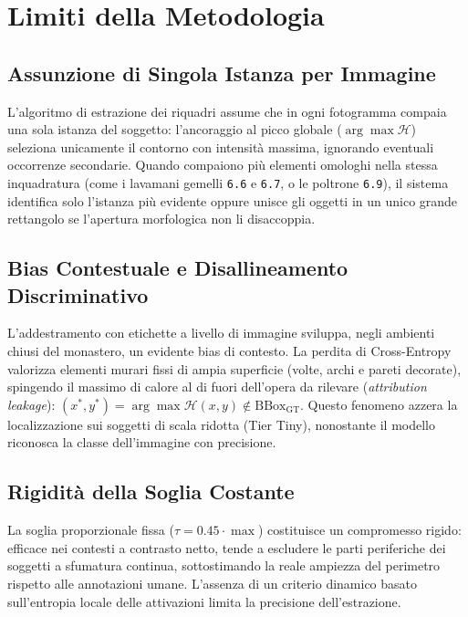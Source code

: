 \chapter{Limiti della Metodologia}
\label{chap:limiti}

\section{Assunzione di Singola Istanza per Immagine}
\label{sec:limiti_istanza}
L'algoritmo di estrazione dei riquadri assume che in ogni fotogramma compaia una sola istanza del soggetto: l'ancoraggio al picco globale ($\arg\max \mathcal{H}$) seleziona unicamente il contorno con intensità massima, ignorando eventuali occorrenze secondarie. Quando compaiono più elementi omologhi nella stessa inquadratura (come i lavamani gemelli \texttt{6.6} e \texttt{6.7}, o le poltrone \texttt{6.9}), il sistema identifica solo l'istanza più evidente oppure unisce gli oggetti in un unico grande rettangolo se l'apertura morfologica non li disaccoppia.

\section{Bias Contestuale e Disallineamento Discriminativo}
\label{sec:limiti_bias}
L'addestramento con etichette a livello di immagine sviluppa, negli ambienti chiusi del monastero, un evidente bias di contesto. La perdita di Cross-Entropy valorizza elementi murari fissi di ampia superficie (volte, archi e pareti decorate), spingendo il massimo di calore al di fuori dell'opera da rilevare (\textit{attribution leakage}): $(x^*, y^*) = \arg\max \mathcal{H}(x, y) \notin \text{BBox}_{\text{GT}}$. Questo fenomeno azzera la localizzazione sui soggetti di scala ridotta (Tier Tiny), nonostante il modello riconosca la classe dell'immagine con precisione.

\section{Rigidità della Soglia Costante}
\label{sec:limiti_soglia}
La soglia proporzionale fissa ($\tau = 0.45 \cdot \max$) costituisce un compromesso rigido: efficace nei contesti a contrasto netto, tende a escludere le parti periferiche dei soggetti a sfumatura continua, sottostimando la reale ampiezza del perimetro rispetto alle annotazioni umane. L'assenza di un criterio dinamico basato sull'entropia locale delle attivazioni limita la precisione dell'estrazione.

